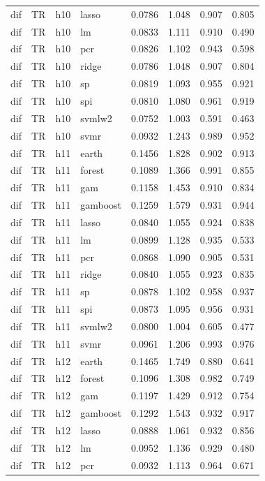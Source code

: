 \begin{ThreePartTable}
\begin{longtable}[t]{llclcccc}
dif & TR & h10 & lasso & 0.0786 & 1.048 & 0.907 & 0.805\\
dif & TR & h10 & lm & 0.0833 & 1.111 & 0.910 & 0.490\\
dif & TR & h10 & pcr & 0.0826 & 1.102 & 0.943 & 0.598\\
dif & TR & h10 & ridge & 0.0786 & 1.048 & 0.907 & 0.804\\
dif & TR & h10 & sp & 0.0819 & 1.093 & 0.955 & 0.921\\
dif & TR & h10 & spi & 0.0810 & 1.080 & 0.961 & 0.919\\
dif & TR & h10 & svmlw2 & 0.0752 & 1.003 & 0.591 & 0.463\\
dif & TR & h10 & svmr & 0.0932 & 1.243 & 0.989 & 0.952\\
\addlinespace
dif & TR & h11 & earth & 0.1456 & 1.828 & 0.902 & 0.913\\
dif & TR & h11 & forest & 0.1089 & 1.366 & 0.991 & 0.855\\
dif & TR & h11 & gam & 0.1158 & 1.453 & 0.910 & 0.834\\
dif & TR & h11 & gamboost & 0.1259 & 1.579 & 0.931 & 0.944\\
dif & TR & h11 & lasso & 0.0840 & 1.055 & 0.924 & 0.838\\
dif & TR & h11 & lm & 0.0899 & 1.128 & 0.935 & 0.533\\
dif & TR & h11 & pcr & 0.0868 & 1.090 & 0.905 & 0.531\\
dif & TR & h11 & ridge & 0.0840 & 1.055 & 0.923 & 0.835\\
dif & TR & h11 & sp & 0.0878 & 1.102 & 0.958 & 0.937\\
dif & TR & h11 & spi & 0.0873 & 1.095 & 0.956 & 0.931\\
dif & TR & h11 & svmlw2 & 0.0800 & 1.004 & 0.605 & 0.477\\
dif & TR & h11 & svmr & 0.0961 & 1.206 & 0.993 & 0.976\\
\addlinespace
dif & TR & h12 & earth & 0.1465 & 1.749 & 0.880 & 0.641\\
dif & TR & h12 & forest & 0.1096 & 1.308 & 0.982 & 0.749\\
dif & TR & h12 & gam & 0.1197 & 1.429 & 0.912 & 0.754\\
dif & TR & h12 & gamboost & 0.1292 & 1.543 & 0.932 & 0.917\\
dif & TR & h12 & lasso & 0.0888 & 1.061 & 0.932 & 0.856\\
dif & TR & h12 & lm & 0.0952 & 1.136 & 0.929 & 0.480\\
dif & TR & h12 & pcr & 0.0932 & 1.113 & 0.964 & 0.671\\

\end{longtable}
\end{ThreePartTable}
